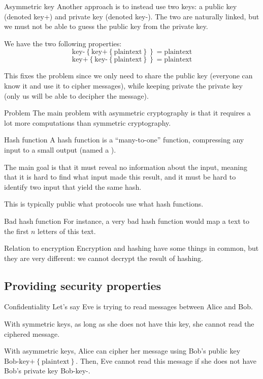 \documentclass[a4paper]{article}
\begin{document}
\begin{parag}{Asymmetric key}
    Another approach is to instead use two keys: a public key (denoted key+) and private key (denoted key-). The two are naturally linked, but we must not be able to guess the public key from the private key.

    We have the two following properties: 
    \[\text{key-}\left\{\text{key+}\left\{\text{plaintext}\right\}\right\} = \text{plaintext}\]
    \[\text{key+}\left\{\text{key-}\left\{\text{plaintext}\right\}\right\} = \text{plaintext}\]
    
    This fixes the problem since we only need to share the public key (everyone can know it and use it to cipher messages), while keeping private the private key (only us will be able to decipher the message).

    \begin{subparag}{Problem}
        The main problem with asymmetric cryptography is that it requires a lot more computations than symmetric cryptography.
    \end{subparag}
\end{parag}

\begin{parag}{Hash function}
    A hash function is a ``many-to-one'' function, compressing any input to a small output (named a ).

    The main goal is that it must reveal no information about the input, meaning that it is hard to find what input made this result, and it must be hard to identify two input that yield the same hash.

    This is typically public what protocols use what hash functions.

    \begin{subparag}{Bad hash function}
        For instance, a very bad hash function would map a text to the first $n$ letters of this text.
    \end{subparag}

    \begin{subparag}{Relation to encryption}
        Encryption and hashing have some things in common, but they are very different: we cannot decrypt the result of hashing.
    \end{subparag}
\end{parag}

\subsection{Providing security properties}
\begin{parag}{Confidentiality}
    Let's say Eve is trying to read messages between Alice and Bob.

    With symmetric keys, as long as she does not have this key, she cannot read the ciphered message.

    With asymmetric keys, Alice can cipher her message using Bob's public key $\text{Bob-key+}\left\{\text{plaintext}\right\}$. Then, Eve cannot read this message if she does not have Bob's private key Bob-key-.
\end{parag}
\end{document}
